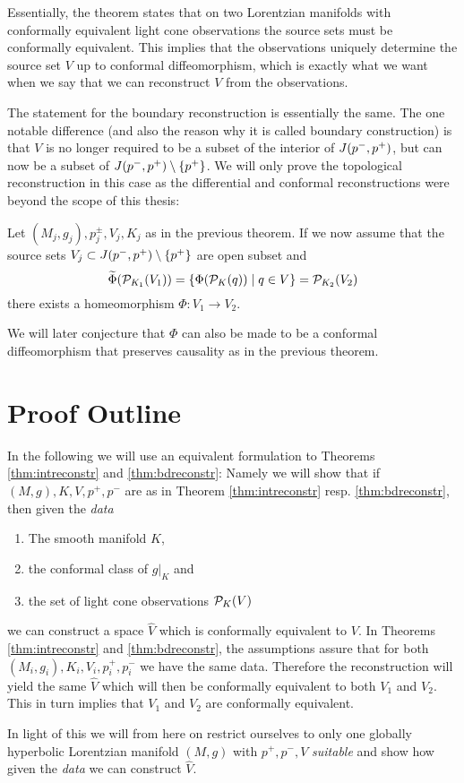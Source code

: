 Essentially, the theorem states that on two Lorentzian manifolds with conformally equivalent light cone observations the source sets must be conformally equivalent. This implies that the observations uniquely determine the source set $V$ up to conformal diffeomorphism, which is exactly what we want when we say that we can reconstruct $V$ from the observations. 

The statement for the boundary reconstruction is essentially the same. The one notable difference (and also the reason why it is called boundary construction) is that $V$ is no longer required to be a subset of the interior of $J(p^-,p^+)$, but can now be a subset of $J(p^-,p^+) \setminus \{p^+\}$. We will only prove the topological reconstruction in this case as the differential and conformal reconstructions were beyond the scope of this thesis:
\begin{theorem}\label{thm:bdreconstr}
    Let $(M_j,g_j), p^\pm_j, V_j, K_j$ as in the previous theorem.
    If we now assume that the source sets $V_j\subset J(p^-,p^+)\setminus\{p^+\}$ are open subset and
    \[
    \widetilde{\Phi}({\mathcal{P}}_{K_1}(V_1)) = \{\Phi({\mathcal{P}}_K(q))\mid q \in V\} = {\mathcal{P}}_{K_2}(V_2)
    \]
    there exists a homeomorphism $\Phi:V_1\to V_2$.
\end{theorem}
We will later conjecture that $\Phi$ can also be made to be a conformal diffeomorphism that preserves causality as in the previous theorem.

\section{Proof Outline}
\begin{remark}[Data]\label{rmk:data} 
    In the following we will use an equivalent formulation to Theorems \ref{thm:intreconstr} and \ref{thm:bdreconstr}: Namely we will show that if $(M,g), K, V, p^+,p^-$ are as in Theorem \ref{thm:intreconstr} resp. \ref{thm:bdreconstr}, then given the \emph{data}
    \begin{enumerate}[label={\textnormal{(\arabic*)}}]
        \item The smooth manifold $K$,
        \item the conformal class of $g\rvert_K$ and
        \item the set of light cone observations ${\mathcal{P}}_K(V)$
    \end{enumerate}
    we can construct a space $\widehat{V}$ which is conformally equivalent to $V$.
    In Theorems \ref{thm:intreconstr} and \ref{thm:bdreconstr}, the assumptions assure that for both $(M_i,g_i), K_i, V_i, p^+_i,p^-_i$ we have the same data. Therefore the reconstruction will yield the same $\widehat{V}$ which will then be conformally equivalent to both $V_1$ and $V_2$. This in turn implies that $V_1$ and $V_2$ are conformally equivalent.

    In light of this we will from here on restrict ourselves to only one globally hyperbolic Lorentzian manifold $(M,g)$ with $p^+,p^-, V$ \emph{suitable} and show how given the \emph{data} we can construct $\widehat{V}$.
\end{remark}
